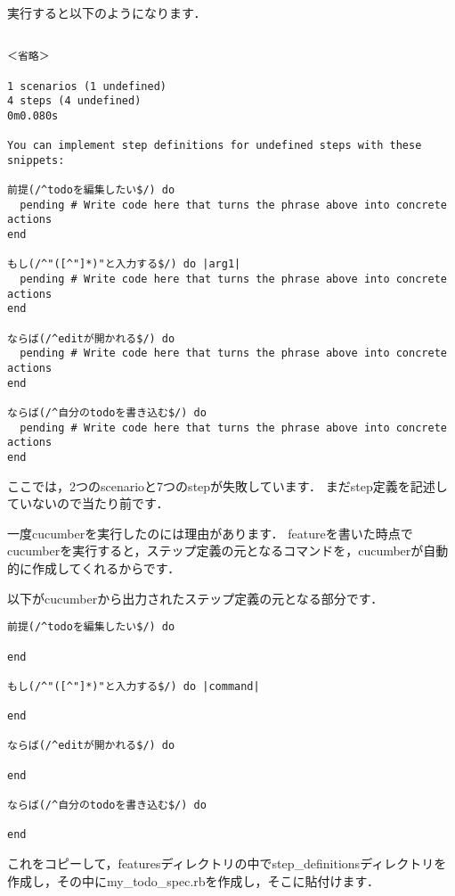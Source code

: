 実行すると以下のようになります．
\begin{lstlisting}[style=customCsh,basicstyle={\scriptsize\ttfamily}]

＜省略＞

1 scenarios (1 undefined)
4 steps (4 undefined)
0m0.080s

You can implement step definitions for undefined steps with these snippets:

前提(/^todoを編集したい$/) do
  pending # Write code here that turns the phrase above into concrete actions
end

もし(/^"([^"]*)"と入力する$/) do |arg1|
  pending # Write code here that turns the phrase above into concrete actions
end

ならば(/^editが開かれる$/) do
  pending # Write code here that turns the phrase above into concrete actions
end

ならば(/^自分のtodoを書き込む$/) do
  pending # Write code here that turns the phrase above into concrete actions
end
\end{lstlisting}
ここでは，2つのscenarioと7つのstepが失敗しています．
まだstep定義を記述していないので当たり前です．

一度cucumberを実行したのには理由があります．
featureを書いた時点でcucumberを実行すると，ステップ定義の元となるコマンドを，cucumberが自動的に作成してくれるからです．

以下がcucumberから出力されたステップ定義の元となる部分です．
\begin{lstlisting}[style=customCsh,basicstyle={\scriptsize\ttfamily}]
前提(/^todoを編集したい$/) do

end

もし(/^"([^"]*)"と入力する$/) do |command|

end

ならば(/^editが開かれる$/) do
  
end

ならば(/^自分のtodoを書き込む$/) do

end
\end{lstlisting}
これをコピーして，featuresディレクトリの中でstep\_definitionsディレクトリを作成し，その中にmy\_todo\_spec.rbを作成し，そこに貼付けます．

